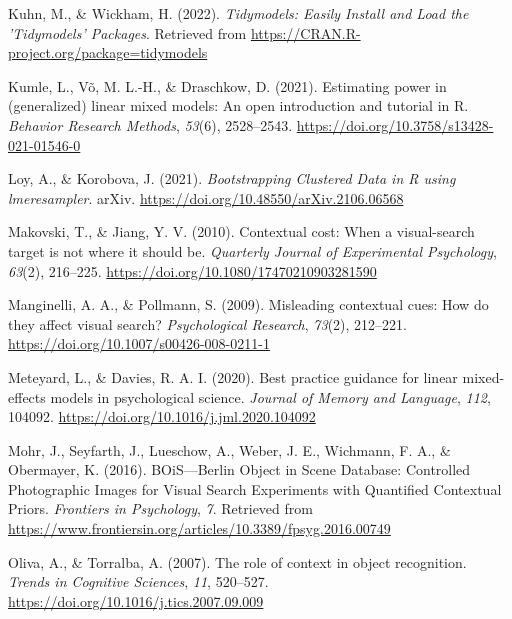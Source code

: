 \documentclass[
  man,floatsintext]{apa7}
\newlength{\cslhangindent}
\newlength{\cslentryspacingunit} %
\newenvironment{CSLReferences}[2] %
 {%
  \setlength{\parindent}{0pt}
  \ifodd #1
  \let\oldpar\par
  \def\par{\hangindent=\cslhangindent\oldpar}
  \fi
  \setlength{\parskip}{#2\cslentryspacingunit}
 }%
 {}
\begin{document}
\begin{CSLReferences}{1}{0}
\leavevmode{}%
Kuhn, M., \& Wickham, H. (2022). \emph{Tidymodels: {Easily} {Install} and {Load} the '{Tidymodels}' {Packages}}. Retrieved from \url{https://CRAN.R-project.org/package=tidymodels}

\leavevmode{}%
Kumle, L., Võ, M. L.-H., \& Draschkow, D. (2021). Estimating power in (generalized) linear mixed models: {An} open introduction and tutorial in {R}. \emph{Behavior Research Methods}, \emph{53}(6), 2528--2543. \url{https://doi.org/10.3758/s13428-021-01546-0}

\leavevmode{}%
Loy, A., \& Korobova, J. (2021). \emph{Bootstrapping {Clustered} {Data} in {R} using lmeresampler}. arXiv. \url{https://doi.org/10.48550/arXiv.2106.06568}

\leavevmode{}%
Makovski, T., \& Jiang, Y. V. (2010). Contextual cost: {When} a visual-search target is not where it should be. \emph{Quarterly Journal of Experimental Psychology}, \emph{63}(2), 216--225. \url{https://doi.org/10.1080/17470210903281590}

\leavevmode{}%
Manginelli, A. A., \& Pollmann, S. (2009). Misleading contextual cues: {How} do they affect visual search? \emph{Psychological Research}, \emph{73}(2), 212--221. \url{https://doi.org/10.1007/s00426-008-0211-1}

\leavevmode{}%
Meteyard, L., \& Davies, R. A. I. (2020). Best practice guidance for linear mixed-effects models in psychological science. \emph{Journal of Memory and Language}, \emph{112}, 104092. \url{https://doi.org/10.1016/j.jml.2020.104092}

\leavevmode{}%
Mohr, J., Seyfarth, J., Lueschow, A., Weber, J. E., Wichmann, F. A., \& Obermayer, K. (2016). {BOiS}---{Berlin} {Object} in {Scene} {Database}: {Controlled} {Photographic} {Images} for {Visual} {Search} {Experiments} with {Quantified} {Contextual} {Priors}. \emph{Frontiers in Psychology}, \emph{7}. Retrieved from \url{https://www.frontiersin.org/articles/10.3389/fpsyg.2016.00749}

\leavevmode{}%
Oliva, A., \& Torralba, A. (2007). The role of context in object recognition. \emph{Trends in Cognitive Sciences}, \emph{11}, 520--527. \url{https://doi.org/10.1016/j.tics.2007.09.009}


\end{CSLReferences}
\end{document}
